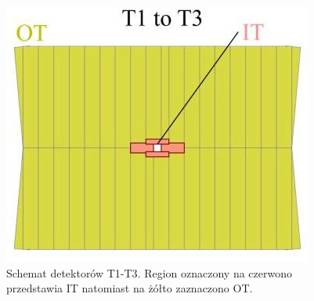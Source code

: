 \begin{figure}[th] 
  \centering
  \includegraphics[scale=0.5]{rozdzial2/OT-Module-design.jpg}
  \caption{Schemat detektorów T1-T3\cite{public}. Region oznaczony na czerwono przedstawia IT natomiast na żółto zaznaczono OT.}
  \label{fig:OTLayput}
\end{figure}

